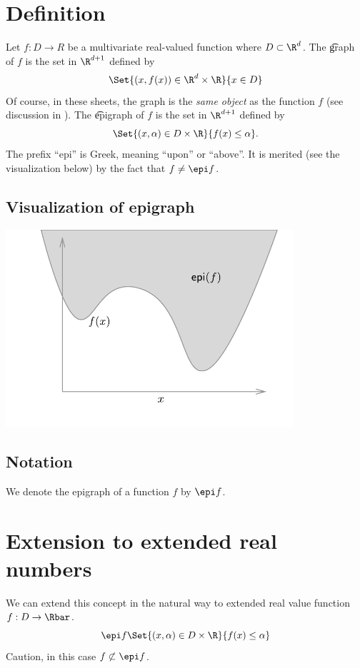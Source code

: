 
\section*{Definition}

Let $f: D \to R$ be a multivariate real-valued function where $D \subset \R ^d$.
The \t{graph} of $f$ is the set in $\R ^{d + 1}$ defined by
\[
\Set{(x, f(x)) \in \R ^d \times  \R }{x \in D}
\]
Of course, in these sheets, the graph is the \textit{same object} as the function $f$ (see discussion in ).
The \t{epigraph} of $f$ is the set in $\R ^{d + 1}$ defined by
\[
\Set{(x, \alpha ) \in D \times  \R }{f(x) \leq \alpha }.
\]
The prefix ``epi'' is Greek, meaning ``upon'' or ``above''.
It is merited (see the visualization below) by the fact that $f \neq \epi f$.

\subsection*{Visualization of epigraph}

\begin{center}\includegraphics[width=0.80\textwidth]{./graphics/epi.pdf}\end{center}
\subsection*{Notation}

We denote the epigraph of a function $f$ by $\epi f$.

\section*{Extension to extended real numbers}

We can extend this concept in the natural way to extended real value function $f: D \to \Rbar$.
\[
\epi f \Set{(x, \alpha ) \in D \times  \R }{f(x) \leq \alpha }
\]
Caution, in this case $f \not\subset \epi f$.



\blankpage
